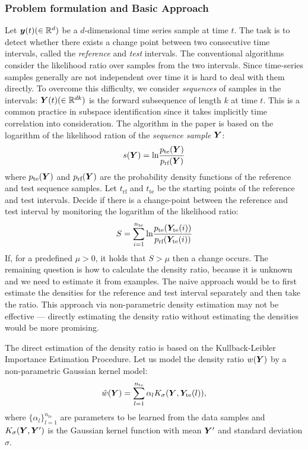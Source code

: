 \subsubsection{Problem formulation and Basic Approach}
Let $\vectorsym{y}(t) (\in \mathbb{R}^d)$ be a $d$-dimensional time series sample at time $t$.
The task is to detect whether there exists a change point between two consecutive time intervals, called the \emph{reference} and \emph{test} intervals.
The conventional algorithms consider the likelihood ratio over samples from the two intervals.
Since time-series samples generally are not independent over time it is hard to deal with them directly.
To overcome this difficulty, we consider \emph{sequences} of samples in the intervals: $\matrixsym{Y}(t)(\in \mathbb{R}^{dk})$ is the forward subsequence of length $k$ at time $t$.
This is a common practice in subspace identification since it takes implicitly time correlation into consideration.
The algorithm in the paper is based on the logarithm of the likelihood ration of the \emph{sequence sample} $\matrixsym{Y}$:
\begin{equation}
  s(\matrixsym{Y}) = \text{ln}\frac{p_\text{te}(\matrixsym{Y})}{p_\text{rf}(\matrixsym{Y})}
\end{equation}
where $p_{\text{te}}(\matrixsym{Y})$ and $p_{\text{rf}}(\matrixsym{Y})$ are the probability density functions of the reference and test sequence samples.
Let $t_{\text{rf}}$ and $t_{\text{te}}$ be the starting points of the reference and test intervals.
Decide if there is a change-point between the reference and test interval by monitoring the logarithm of the likelihood ratio:
\begin{equation}
  S = \sum_{i=1}^{n_\text{te}} \text{ln} \frac{p_{\text{te}}(\matrixsym{Y}_\text{te}(i))}{p_\text{rf}(\matrixsym{Y}_\text{te}(i))}
\end{equation}
If, for a predefined $\mu > 0$, it holds that $S > \mu$ then a change occurs.
The remaining question is how to calculate the density ratio, because it is unknown and we need to estimate it from examples.
The naive approach would be to first estimate the densities for the reference and test interval separately and then take the ratio.
This approach via non-parametric density estimation may not be effective --- directly estimating the density ratio without estimating the densities would be more promising.

The direct estimation of the density ratio is based on the Kullback-Leibler Importance Estimation Procedure.
Let us model the density ratio $w(\matrixsym{Y})$ by a non-parametric Gaussian kernel model:
\begin{equation}
  \hat{w}(\matrixsym{Y}) = \sum_{l=1}^{n_\text{te}} \alpha_l K_\sigma(\matrixsym{Y}, \matrixsym{Y}_\text{te}(l)),
\end{equation}
where $\{\alpha_l\}_{l=1}^{n_\text{te}}$ are parameters to be learned from the data samples and $K_\sigma(\matrixsym{Y}, \matrixsym{Y}')$ is the Gaussian kernel function with mean $\matrixsym{Y}'$ and standard deviation $\sigma$.


